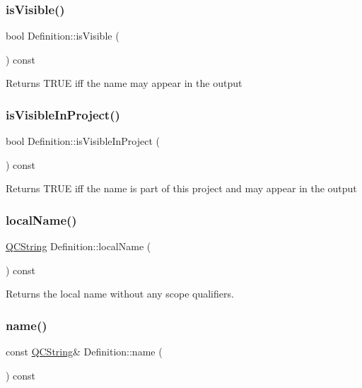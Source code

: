 \subsubsection{\texorpdfstring{isVisible()}{isVisible()}}
{\footnotesize\ttfamily bool Definition\+::is\+Visible (\begin{DoxyParamCaption}{ }\end{DoxyParamCaption}) const\hspace{0.3cm}{\ttfamily [virtual]}}

Returns T\+R\+UE iff the name may appear in the output \mbox{\label{class_definition_af5c5321a920e7ff5fb304b630f51964e}} 
\subsubsection{\texorpdfstring{isVisibleInProject()}{isVisibleInProject()}}
{\footnotesize\ttfamily bool Definition\+::is\+Visible\+In\+Project (\begin{DoxyParamCaption}{ }\end{DoxyParamCaption}) const\hspace{0.3cm}{\ttfamily [virtual]}}

Returns T\+R\+UE iff the name is part of this project and may appear in the output \mbox{\label{class_definition_a5cff26b8db9bc19c6f61445ed8d88a46}} 
\subsubsection{\texorpdfstring{localName()}{localName()}}
{\footnotesize\ttfamily \mbox{\hyperlink{class_q_c_string}{Q\+C\+String}} Definition\+::local\+Name (\begin{DoxyParamCaption}{ }\end{DoxyParamCaption}) const}

Returns the local name without any scope qualifiers. \mbox{\label{class_definition_a9324000f785d7b6b098878a3bca4df5b}} 
\subsubsection{\texorpdfstring{name()}{name()}}
{\footnotesize\ttfamily const \mbox{\hyperlink{class_q_c_string}{Q\+C\+String}}\& Definition\+::name (\begin{DoxyParamCaption}{ }\end{DoxyParamCaption}) const\hspace{0.3cm}{\ttfamily [inline]}}

